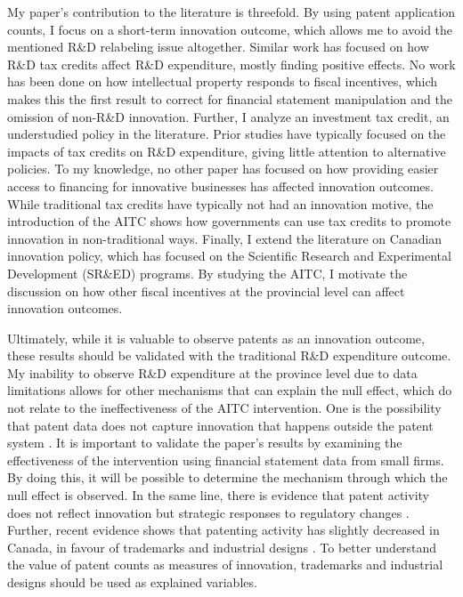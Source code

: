 \documentclass[../main.tex]{subfiles}
\begin{document}
My paper's contribution to the literature is threefold. By using patent application counts, I focus on a short-term innovation outcome, which allows me to avoid the mentioned R\&D relabeling issue altogether. Similar work has focused on how R\&D tax credits affect R\&D expenditure, mostly finding positive effects. No work has been done on how intellectual property responds to fiscal incentives, which makes this the first result to correct for financial statement manipulation and the omission of non-R\&D innovation. Further, I analyze an investment tax credit, an understudied policy in the literature. Prior studies have typically focused on the impacts of tax credits on R\&D expenditure, giving little attention to alternative policies. To my knowledge, no other paper has focused on how providing easier access to financing for innovative businesses has affected innovation outcomes. While traditional tax credits have typically not had an innovation motive, the introduction of the AITC shows how governments can use tax credits to promote innovation in non-traditional ways. Finally, I extend the literature on Canadian innovation policy, which has focused on the Scientific Research and Experimental Development (SR\&ED) programs. By studying the AITC, I motivate the discussion on how other fiscal incentives at the provincial level can affect innovation outcomes.

Ultimately, while it is valuable to observe patents as an innovation outcome, these results should be validated with the traditional R\&D expenditure outcome. My inability to observe R\&D expenditure at the province level due to data limitations allows for other mechanisms that can explain the null effect, which do not relate to the ineffectiveness of the AITC intervention. One is the possibility that patent data does not capture innovation that happens outside the patent system \parencite{moser13}. It is important to validate the paper’s results by examining the effectiveness of the intervention using financial statement data from small firms. By doing this, it will be possible to determine the mechanism through which the null effect is observed. In the same line, there is evidence that patent activity does not reflect innovation but strategic responses to regulatory changes \parencite{graham_mowrey04}. Further, recent evidence shows that patenting activity has slightly decreased in Canada, in favour of trademarks and industrial designs \parencite{canadianintellectualpropertyoffice22}. To better understand the value of patent counts as measures of innovation, trademarks and industrial designs should be used as explained variables. 
\end{document}
